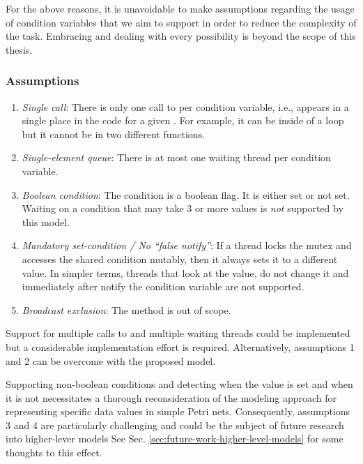 For the above reasons, it is unavoidable to make assumptions
regarding the usage of condition variables that we aim to support
in order to reduce the complexity of the task.
Embracing and dealing with every possibility is beyond the scope of this thesis.

\subsubsection{Assumptions}

\begin{enumerate}
      \item \emph{Single call}: There is only one call to  per condition variable, i.e.,
             appears in a single place in the code for a given .
            For example, it can be inside of a loop but it cannot be in two different functions.
      \item \emph{Single-element queue}: There is at most one waiting thread per condition variable.
      \item \emph{Boolean condition}: The condition is a boolean flag. It is either set or not set.
            Waiting on a condition that may take 3 or more values is \emph{not} supported by this model.
      \item \emph{Mandatory set-condition / No ``false notify''}: If a thread locks the mutex and accesses the shared condition mutably,
            then it always sets it to a different value.
            In simpler terms, threads that look at the value, do not change it
            and immediately after notify the condition variable are not supported.
      \item \emph{Broadcast exclusion}: The method  is out of scope.
\end{enumerate}

Support for multiple calls to  and multiple waiting threads could be implemented
but a considerable implementation effort is required.
Alternatively, assumptions 1 and 2 can be overcome with the proposed model.

Supporting non-boolean conditions
and detecting when the value is set and when it is not
necessitates a thorough reconsideration of the modeling approach
for representing specific data values in simple Petri nets.
Consequently, assumptions 3 and 4 are particularly challenging and
could be the subject of future research into higher-lever models
See Sec. \ref{sec:future-work-higher-level-models} for some thoughts to this effect.

